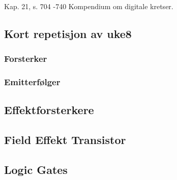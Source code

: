 Kap. 21, s. 704 -740
Kompendium om digitale kretser.

\subsection{Kort repetisjon av uke8}
  \subsubsection{Forsterker}
    
  \subsubsection{Emitterfølger}
    

\subsection{Effektforsterkere}
  

\subsection{Field Effekt Transistor}
  

\subsection{Logic Gates}
  

